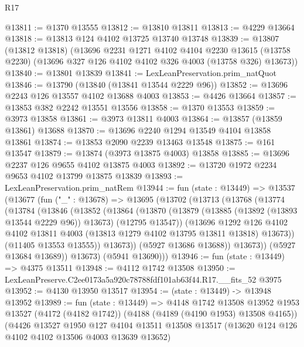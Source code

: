 \begin{lexlean}{R17}
\begin{coremodule}
@13811 := @1370 @13555
@13812 := @13810 @13811
@13813 := @4229 @13664
@13818 := @13813 @124 @4102 @13725 @13740 @13748
@13839 := @13807
    (@13812 @13818)
    (@13696
      @2231
      @1271
      @4102
      @4104
      @2230
      @13615
      (@13758 @2230)
      (@13696 @327 @126 @4102 @4102 @326 @4003 (@13758 @326) @13673))
@13840 := @13801 @13839
@13841 := LexLeanPreservation.prim_natQuot
@13846 := @13790 (@13840 (@13841 @13544 @2229 @96))
@13852 := @13696 @2243 @126 @13557 @4102 @13688 @4003
@13853 := @4426 @13664
@13857 := @13853 @382 @2242 @13551 @13556
@13858 := @1370 @13553
@13859 := @3973 @13858
@13861 := @3973 @13811 @4003
@13864 := @13857 (@13859 @13861) @13688
@13870 := @13696 @2240 @1294 @13549 @4104 @13858 @13861
@13874 := @13853 @2090 @2239 @13463 @13548
@13875 := @161 @13547
@13879 := @13874 (@3973 @13875 @4003) @13858
@13885 := @13696 @2237 @126 @9655 @4102 @13875 @4003
@13892 := @13720 @1972 @2234 @9653 @4102 @13799 @13875 @13839
@13893 := LexLeanPreservation.prim_natRem
@13944 := fun (state : @13449) =>
  @13537
    (@13677
      (fun ("_" : @13678) =>
      @13695
        (@13702
          (@13713
            (@13768
              (@13774
                (@13784
                  (@13846
                    (@13852
                      (@13864
                        (@13870
                          (@13879
                            (@13885 (@13892 (@13893 @13544 @2229 @96)) @13673)
                            (@12795 @13547))
                          (@13696
                            @1292
                            @126
                            @4102
                            @4102
                            @13811
                            @4003
                            (@13813 @1279 @4102 @13795 @13811 @13818)
                            @13673))
                        (@11405 @13553 @13555))
                      @13673))
                  (@5927 @13686 @13688))
                @13673))
            (@5927 @13684 @13689))
          @13673)
        (@5941 @13690)))
@13946 := fun (state : @13449) => @4375 @13511
@13948 := @4112 @1742 @13508
@13950 := LexLeanPreserve.C2ee0173a5a920c78788fdf101ab63f44.R17.__fits_52 @3975
@13952 := @4130 @13950 @13517
@13954 := (state : @13449) -> @13948 @13952
@13989 := fun (state : @13449) =>
  @4148
    @1742
    @13508
    @13952
    @1953
    @13527
    (@4172 (@4182 @1742))
    (@4188 (@4189 (@4190 @1953) @13508 @4165))
    (@4426
      @13527
      @1950
      @127
      @4104
      @13511
      @13508
      @13517
      (@13620 @124 @126 @4102 @4102 @13506 @4003 @13639 @13652)

\end{coremodule}
\end{lexlean}
